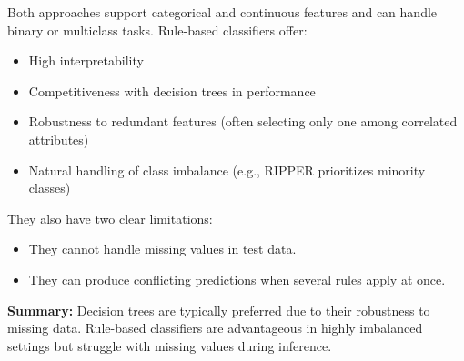 Both approaches support categorical and continuous features and can handle binary or multiclass tasks. Rule-based classifiers offer:
\begin{itemize}
    \item High interpretability
    \item Competitiveness with decision trees in performance
    \item Robustness to redundant features (often selecting only one among correlated attributes)
    \item Natural handling of class imbalance (e.g., RIPPER prioritizes minority classes)
\end{itemize}

They also have two clear limitations:
\begin{itemize}
    \item They cannot handle missing values in test data.
    \item They can produce conflicting predictions when several rules apply at once.
\end{itemize}

\noindent
\textbf{Summary:} Decision trees are typically preferred due to their robustness to missing data. Rule-based classifiers are advantageous in highly imbalanced settings but struggle with missing values during inference.
